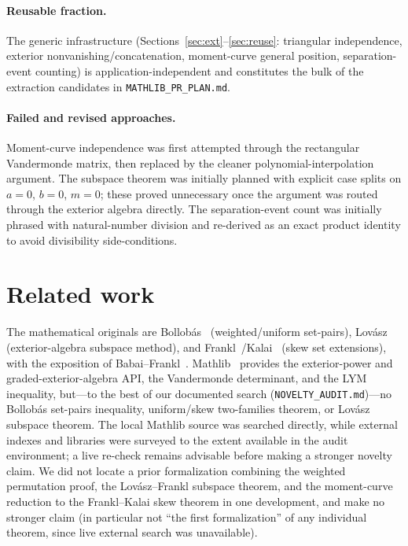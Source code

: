 \documentclass[11pt]{article}
\begin{document}
\paragraph{Reusable fraction.} The generic infrastructure
(Sections~\ref{sec:ext}--\ref{sec:reuse}: triangular independence, exterior
nonvanishing/concatenation, moment-curve general position, separation-event counting)
is application-independent and constitutes the bulk of the extraction candidates in
\texttt{MATHLIB\_PR\_PLAN.md}.

\paragraph{Failed and revised approaches.} Moment-curve independence was first attempted
through the rectangular Vandermonde matrix, then replaced by the cleaner
polynomial-interpolation argument. The subspace theorem was initially planned with
explicit case splits on $a=0$, $b=0$, $m=0$; these proved unnecessary once the argument
was routed through the exterior algebra directly. The separation-event count was
initially phrased with natural-number division and re-derived as an exact product
identity to avoid divisibility side-conditions.

\section{Related work}\label{sec:related}

The mathematical originals are Bollob\'as~\cite{bollobas1965} (weighted/uniform
set-pairs), Lov\'asz~\cite{lovasz1977} (exterior-algebra subspace method), and
Frankl~\cite{frankl1982}/Kalai~\cite{kalai1984} (skew set extensions), with the
exposition of Babai--Frankl~\cite{babaifrankl1992}. Mathlib~\cite{mathlib2020} provides
the exterior-power and graded-exterior-algebra API, the Vandermonde determinant, and the
LYM inequality, but---to the best of our documented search
(\texttt{NOVELTY\_AUDIT.md})---no Bollob\'as set-pairs inequality, uniform/skew
two-families theorem, or Lov\'asz subspace theorem. The local Mathlib source was searched directly, while external indexes and libraries were surveyed to the extent available in the audit environment; a live re-check remains advisable before making a stronger novelty claim. We did not locate a prior formalization combining the weighted permutation proof, the Lov\'asz--Frankl subspace theorem, and the
moment-curve reduction to the Frankl--Kalai skew theorem in one development, and make no
stronger claim (in particular not ``the first formalization'' of any individual
theorem, since live external search was unavailable).
\end{document}
